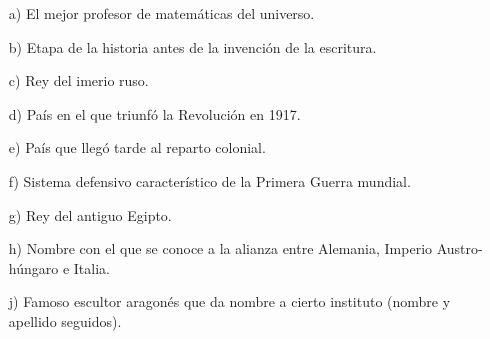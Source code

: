 \documentclass[a4paper]{article}
\begin{document}
\begin{itemize}
	\item[a)] El mejor profesor de matemáticas del universo.
	\item[b)] Etapa de la historia antes de la invención de la escritura.
	\item[c)] Rey del imerio ruso.
	\item[d)] País en el que triunfó la Revolución en 1917.
	\item[e)] País que llegó tarde al reparto colonial.
	\item[f)] Sistema defensivo característico de la Primera Guerra mundial.
	\item[g)] Rey del antiguo Egipto.
	\item[h)] Nombre con el que se conoce a la alianza entre Alemania, Imperio Austro-húngaro e Italia.
	\item[j)] Famoso escultor aragonés que da nombre a cierto instituto (nombre y apellido seguidos).
\end{itemize}
\end{document}
